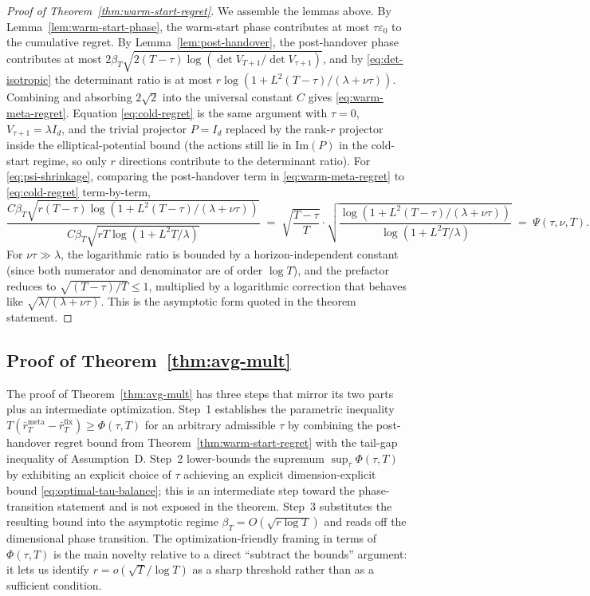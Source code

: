 \documentclass{article}
\theoremstyle{definition}
\theoremstyle{remark}
\newcommand{\meta}{\mathrm{meta}}
\newcommand{\fix}{\mathrm{fix}}
\theoremstyle{remark}
\begin{document}
\begin{proof}[Proof of Theorem~\ref{thm:warm-start-regret}]
We assemble the lemmas above. By Lemma~\ref{lem:warm-start-phase}, the
warm-start phase contributes at most $\tau\varepsilon_0$ to the
cumulative regret. By Lemma~\ref{lem:post-handover}, the post-handover
phase contributes at most
$2\beta_T\sqrt{2(T-\tau)\log(\det V_{T+1}/\det V_{\tau+1})}$, and by
\eqref{eq:det-isotropic} the determinant ratio is at most
$r\log(1+L^2(T-\tau)/(\lambda+\nu\tau))$. Combining and absorbing
$2\sqrt{2}$ into the universal constant $C$ gives
\eqref{eq:warm-meta-regret}. Equation \eqref{eq:cold-regret} is the
same argument with $\tau=0$, $V_{\tau+1}=\lambda I_d$, and the trivial
projector $P=I_d$ replaced by the rank-$r$ projector inside the
elliptical-potential bound (the actions still lie in $\mathrm{Im}(P)$
in the cold-start regime, so only $r$ directions contribute to the
determinant ratio). For \eqref{eq:psi-shrinkage}, comparing the
post-handover term in \eqref{eq:warm-meta-regret} to
\eqref{eq:cold-regret} term-by-term,
\[
\frac{C\beta_T\sqrt{r(T-\tau)\log(1+L^2(T-\tau)/(\lambda+\nu\tau))}}
     {C\beta_T\sqrt{rT\log(1+L^2T/\lambda)}}
\;=\;
\sqrt{\frac{T-\tau}{T}}\cdot
\sqrt{\frac{\log(1+L^2(T-\tau)/(\lambda+\nu\tau))}{\log(1+L^2T/\lambda)}}
\;=\;\Psi(\tau,\nu,T).
\]
For $\nu\tau\gg\lambda$, the logarithmic ratio is bounded by a
horizon-independent constant (since both numerator and denominator are
of order $\log T$), and the prefactor reduces to $\sqrt{(T-\tau)/T}\le 1$,
multiplied by a logarithmic correction that behaves like
$\sqrt{\lambda/(\lambda+\nu\tau)}$. This is the asymptotic form quoted
in the theorem statement.
\end{proof}


\subsection{Proof of Theorem~\ref{thm:avg-mult}}
\label{app:proof-avg-mult}

The proof of Theorem~\ref{thm:avg-mult} has three steps that mirror
its two parts plus an intermediate optimization. Step~1 establishes
the parametric inequality
$T(\bar r_T^{\meta}-\bar r_T^{\fix})\ge\Phi(\tau,T)$ for an arbitrary
admissible $\tau$ by combining the post-handover regret bound from
Theorem~\ref{thm:warm-start-regret} with the tail-gap inequality of
Assumption~D. Step~2 lower-bounds the supremum
$\sup_\tau\Phi(\tau,T)$ by exhibiting an explicit choice of $\tau$
achieving an explicit dimension-explicit bound
\eqref{eq:optimal-tau-balance}; this is an intermediate step toward
the phase-transition statement and is not exposed in the theorem.
Step~3 substitutes the resulting bound into the asymptotic regime
$\beta_T=O(\sqrt{r\log T})$ and reads off the dimensional phase
transition. The optimization-friendly framing in terms of
$\Phi(\tau,T)$ is the main novelty relative to a direct ``subtract the
bounds'' argument: it lets us identify $r=o(\sqrt{T}/\log T)$ as a sharp
threshold rather than as a sufficient condition.
\end{document}
